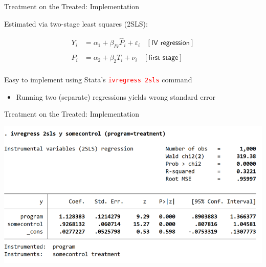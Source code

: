\documentclass[10pt,xcolor=table,ignorenonframetext,aspectratio=169]{beamer}
\newlength{\wideitemsep}
\let\olditem\item
\renewcommand{\item}{\setlength{\itemsep}{\wideitemsep}\olditem}
\begin{document}

\begin{frame}{Treatment on the Treated:  Implementation}

\medskip
Estimated via two-stage least squares (2SLS):
\begin{small}
	\begin{equation*}
	\begin{split}
	Y_i &= \alpha_1 + \beta_{IV} \hat{P}_i + \varepsilon_i \ \ \ \ [\textsf{IV regression}] \\
	& \\
	P_i &= \alpha_2 + \beta_2 T_i + \nu_i \ \ \ \ [\textsf{first stage}]\\
	\end{split}
	\end{equation*}
\end{small}


\medskip
Easy to implement using Stata's \textcolor{red}{\texttt{ivregress 2sls}} command 

\medskip
\begin{itemize}
	
	\item Running two (separate) regressions yields wrong standard error
	
\end{itemize}

\end{frame}



\begin{frame}{Treatment on the Treated:  Implementation}

\medskip
\begin{center}
\includegraphics[width=\textwidth]{img/StataIV1.png}
\end{center}

\end{frame}
\end{document}
